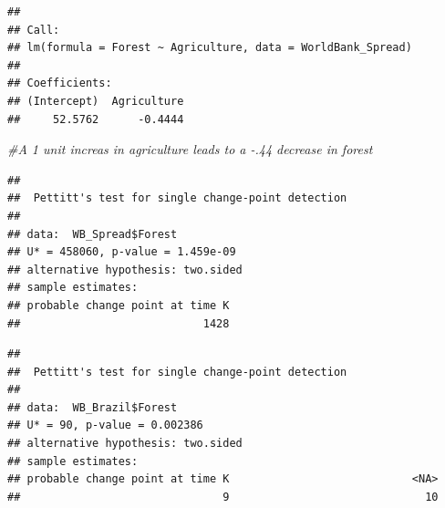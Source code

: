 \documentclass[12pt,]{article}
\newenvironment{Shaded}{\begin{snugshade}}{\end{snugshade}}
\newcommand{\KeywordTok}[1]{\textcolor[rgb]{0.13,0.29,0.53}{\textbf{#1}}}
\newcommand{\CommentTok}[1]{\textcolor[rgb]{0.56,0.35,0.01}{\textit{#1}}}
\newcommand{\OperatorTok}[1]{\textcolor[rgb]{0.81,0.36,0.00}{\textbf{#1}}}
\newcommand{\NormalTok}[1]{#1}
\begin{document}
\begin{verbatim}
## 
## Call:
## lm(formula = Forest ~ Agriculture, data = WorldBank_Spread)
## 
## Coefficients:
## (Intercept)  Agriculture  
##     52.5762      -0.4444
\end{verbatim}

\begin{Shaded}
\begin{Highlighting}[]
\CommentTok{#A 1 unit increas in agriculture leads to a -.44 decrease in forest }
\end{Highlighting}
\end{Shaded}

\begin{Shaded}
\end{Shaded}

\begin{verbatim}
## 
##  Pettitt's test for single change-point detection
## 
## data:  WB_Spread$Forest
## U* = 458060, p-value = 1.459e-09
## alternative hypothesis: two.sided
## sample estimates:
## probable change point at time K 
##                            1428
\end{verbatim}

\begin{Shaded}
\end{Shaded}

\begin{verbatim}
## 
##  Pettitt's test for single change-point detection
## 
## data:  WB_Brazil$Forest
## U* = 90, p-value = 0.002386
## alternative hypothesis: two.sided
## sample estimates:
## probable change point at time K                            <NA> 
##                               9                              10
\end{verbatim}

\begin{Shaded}
\end{Shaded}
\end{document}
